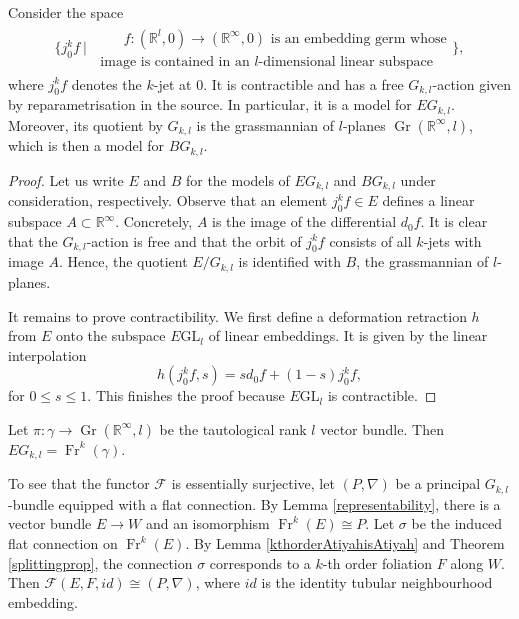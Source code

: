 \documentclass[10pt]{amsart}
\newcommand{\F}{{\mathcal{F}}}
\newcommand{\Gr}{\operatorname{Gr}}
\newcommand{\Fr}{{\operatorname{Fr}}}
\numberwithin{theoremalpha}{section}
\numberwithin{equation}{section}
\numberwithin{definition}{section}
\numberwithin{theorem}{section}
\numberwithin{proposition}{section}
\numberwithin{lemma}{section}
\numberwithin{example}{section}
\numberwithin{remark}{section}
\numberwithin{corollary}{section}
\numberwithin{question}{section}
\numberwithin{problem}{section}
\numberwithin{assumption}{section}
\theoremstyle{named}
\numberwithin{equation}{section}
\begin{document}
\begin{lemma} \label{classifyingspacemodel}
Consider the space 
\begin{align*}
\big\{ j_{0}^{k} f \ | \    \begin{array}{lr}
\qquad f : (\mathbb{R}^l, 0) \to (\mathbb{R}^{\infty}, 0) \text{ is an embedding germ whose}   \\
\text{ image is contained in an $l$-dimensional linear subspace}
\end{array}    \big\},
\end{align*}
where $j_{0}^{k} f$ denotes the $k$-jet at $0$. It is contractible and has a free $G_{k,l}$-action given by reparametrisation in the source. In particular, it is a model for $EG_{k,l}$. Moreover, its quotient by $G_{k,l}$ is the grassmannian of $l$-planes $\Gr(\mathbb{R}^{\infty}, l)$, which is then a model for $BG_{k,l}$. 
\end{lemma}
\begin{proof}
Let us write $E$ and $B$ for the models of $EG_{k,l}$ and $BG_{k,l}$ under consideration, respectively. Observe that an element $j_{0}^{k}f \in E$ defines a linear subspace $A \subset \mathbb{R}^{\infty}$. Concretely, $A$ is the image of the differential $d_{0}f$. It is clear that the $G_{k,l}$-action is free and that the orbit of $j_{0}^{k}f$ consists of all $k$-jets with image $A$. Hence, the quotient $E/G_{k,l}$ is identified with $B$, the grassmannian of $l$-planes. 

It remains to prove contractibility. We first define a deformation retraction $h$ from $E$ onto the subspace $E\mathrm{GL}_{l}$ of linear embeddings. It is given by the linear interpolation 
\[
h(j_0^{k}f, s) = s d_{0}f + (1 - s) j_{0}^{k}f,
\]
for $0 \leq s \leq 1$. This finishes the proof because $E\mathrm{GL}_{l}$ is contractible. 
\end{proof}

\begin{corollary}
Let $\pi: \gamma \to \Gr(\mathbb{R}^{\infty}, l)$ be the tautological rank $l$ vector bundle. Then $EG_{k,l} = \Fr^{k}(\gamma)$. 
\end{corollary}

To see that the functor $\F$ is essentially surjective, let $(P, \nabla)$ be a principal $G_{k,l}$-bundle equipped with a flat connection. By Lemma \ref{representability}, there is a vector bundle $E \to W$ and an isomorphism $\Fr^{k}(E) \cong P$. Let $\sigma$ be the induced flat connection on $\Fr^{k}(E)$. By Lemma \ref{kthorderAtiyahisAtiyah} and Theorem \ref{splittingprop}, the connection $\sigma$ corresponds to a $k$-th order foliation $F$ along $W$. Then $\F(E, F, id) \cong (P, \nabla)$, where $id$ is the identity tubular neighbourhood embedding. 
\end{document}
